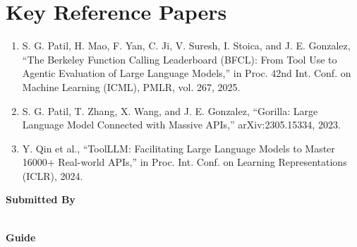 \documentclass[11pt]{article}
\begin{document}
\section*{Key Reference Papers}
\begin{enumerate}
  \item S. G. Patil, H. Mao, F. Yan, C. Ji, V. Suresh, I. Stoica, and J. E. Gonzalez, ``The Berkeley Function Calling Leaderboard (BFCL): From Tool Use to Agentic Evaluation of Large Language Models,'' in Proc. 42nd Int. Conf. on Machine Learning (ICML), PMLR, vol. 267, 2025.
  \item S. G. Patil, T. Zhang, X. Wang, and J. E. Gonzalez, ``Gorilla: Large Language Model Connected with Massive APIs,'' arXiv:2305.15334, 2023.
  \item Y. Qin et al., ``ToolLLM: Facilitating Large Language Models to Master 16000+ Real-world APIs,'' in Proc. Int. Conf. on Learning Representations (ICLR), 2024.
\end{enumerate}
\vspace{0.8em}
\noindent\textbf{Submitted By}\\
\seminarName\\
\seminarRoll

\vspace{0.6em}
\noindent\textbf{Guide}\\
\seminarGuide
\end{document}

